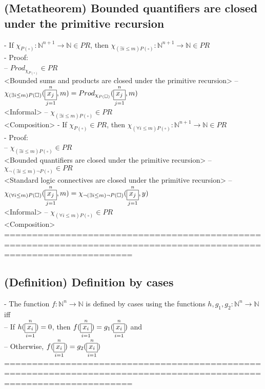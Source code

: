 \documentclass{book}
\newcommand{\placeholder}{\square}
\newcommand{\vdc}[3]{\underset{#2}{\overset{#3}{\fbox{$#1$}}}}
\begin{document}
\subsection{(Metatheorem) Bounded quantifiers are closed under the primitive recursion} %
	- If $\chi_{P(\placeholder)}: \mathbb{N}^{n+1} \rightarrow \mathbb{N} \in PR$, then $\chi_{(\exists i \leq m) P(\placeholder)}: \mathbb{N}^{n+1} \rightarrow \mathbb{N} \in PR$ \\
	- Proof: \\
		-- $Prod_{\chi_{P(\placeholder)}} \in PR$ \\ <Bounded sums and products are closed under the primitive recursion>
		-- $\chi_{(\exists i \leq m) P(\placeholder)}(\vdc{x_j}{j=1}{n}, m) = Prod_{\chi_{P(\placeholder)}}(\vdc{x_j}{j=1}{n}, m)$ \\ <Informal>
		-- $\chi_{(\exists i \leq m) P(\placeholder)} \in PR$ \\ <Composition>
	- If $\chi_{P(\placeholder)} \in PR$, then $\chi_{(\forall i \leq m) P(\placeholder)}: \mathbb{N}^{n+1} \rightarrow \mathbb{N} \in PR$ \\
	- Proof: \\
		-- $\chi_{(\exists i \leq m) P(\placeholder)} \in PR$ \\ <Bounded quantifiers are closed under the primitive recursion>
		-- $\chi_{\lnot (\exists i \leq m) \lnot P(\placeholder)} \in PR$ \\ <Standard logic connectives are closed under the primitive recursion>
		-- $\chi_{(\forall i \leq m) P(\placeholder)}(\vdc{x_j}{j=1}{n}, m) = \chi_{\lnot (\exists i \leq m) \lnot P(\placeholder)}(\vdc{x_j}{j=1}{n}, y)$ \\ <Informal>
		-- $\chi_{(\forall i \leq m) P(\placeholder)} \in PR$ \\ <Composition>
	===================================================================================================================
\subsection{(Definition) Definition by cases} %
	- The function $f: \mathbb{N}^n \rightarrow \mathbb{N}$ is defined by cases using the functions $h, g_1, g_2: \mathbb{N}^n \rightarrow \mathbb{N}$ iff \\
		-- If $h(\vdc{x_i}{i=1}{n}) = 0$, then $f(\vdc{x_i}{i=1}{n}) = g_1(\vdc{x_i}{i=1}{n})$ and \\
		-- Otherwise, $f(\vdc{x_i}{i=1}{n}) = g_2(\vdc{x_i}{i=1}{n})$ \\
	===================================================================================================================
\end{document}
